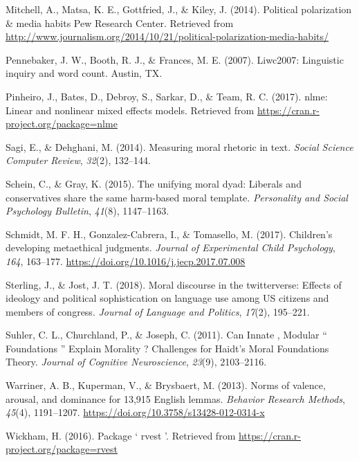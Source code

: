 \documentclass[
  english,
  man]{apa6}
\newlength{\cslhangindent}
\newlength{\cslentryspacingunit} %
\newenvironment{CSLReferences}[2] %
 {%
  \setlength{\parindent}{0pt}
  \ifodd #1
  \let\oldpar\par
  \def\par{\hangindent=\cslhangindent\oldpar}
  \fi
  \setlength{\parskip}{#2\cslentryspacingunit}
 }%
 {}
\begin{document}
\begin{CSLReferences}{1}{0}
\leavevmode{}%
Mitchell, A., Matsa, K. E., Gottfried, J., \& Kiley, J. (2014). {Political polarization {\&} media habits \textbar{} Pew Research Center}. Retrieved from \url{http://www.journalism.org/2014/10/21/political-polarization-media-habits/}

\leavevmode{}%
Pennebaker, J. W., Booth, R. J., \& Frances, M. E. (2007). {Liwc2007: Linguistic inquiry and word count}. Austin, TX.

\leavevmode{}%
Pinheiro, J., Bates, D., Debroy, S., Sarkar, D., \& Team, R. C. (2017). {nlme: Linear and nonlinear mixed effects models}. Retrieved from \url{https://cran.r-project.org/package=nlme}

\leavevmode{}%
Sagi, E., \& Dehghani, M. (2014). Measuring moral rhetoric in text. \emph{Social Science Computer Review}, \emph{32}(2), 132--144.

\leavevmode{}%
Schein, C., \& Gray, K. (2015). The unifying moral dyad: Liberals and conservatives share the same harm-based moral template. \emph{Personality and Social Psychology Bulletin}, \emph{41}(8), 1147--1163.

\leavevmode{}%
Schmidt, M. F. H., Gonzalez-Cabrera, I., \& Tomasello, M. (2017). {Children's developing metaethical judgments}. \emph{Journal of Experimental Child Psychology}, \emph{164}, 163--177. \url{https://doi.org/10.1016/j.jecp.2017.07.008}

\leavevmode{}%
Sterling, J., \& Jost, J. T. (2018). Moral discourse in the twitterverse: Effects of ideology and political sophistication on language use among US citizens and members of congress. \emph{Journal of Language and Politics}, \emph{17}(2), 195--221.

\leavevmode{}%
Suhler, C. L., Churchland, P., \& Joseph, C. (2011). {Can Innate , Modular {`` Foundations ''} Explain Morality ? Challenges for Haidt's Moral Foundations Theory}. \emph{Journal of Cognitive Neuroscience}, \emph{23}(9), 2103--2116.

\leavevmode{}%
Warriner, A. B., Kuperman, V., \& Brysbaert, M. (2013). {Norms of valence, arousal, and dominance for 13,915 English lemmas}. \emph{Behavior Research Methods}, \emph{45}(4), 1191--1207. \url{https://doi.org/10.3758/s13428-012-0314-x}

\leavevmode{}%
Wickham, H. (2016). {Package ` rvest '}. Retrieved from \url{https://cran.r-project.org/package=rvest}

\end{CSLReferences}
\end{document}
